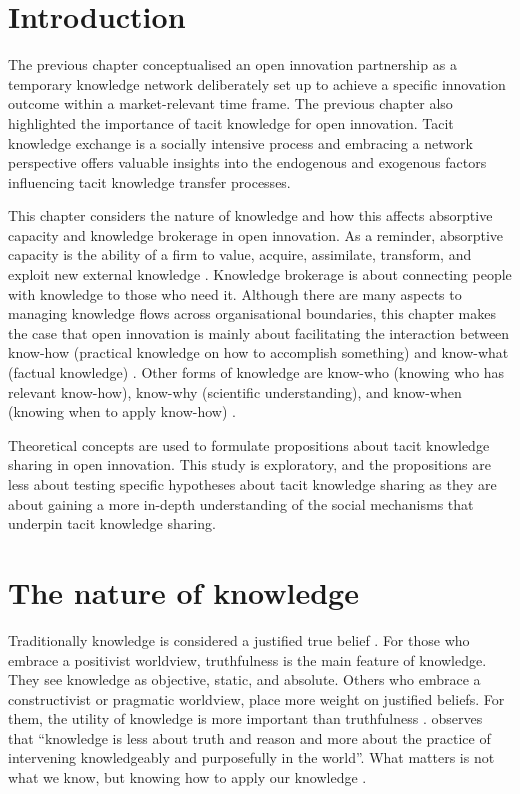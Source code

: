 
\section{Introduction}

The previous chapter conceptualised an open innovation partnership as a temporary knowledge network deliberately set up to achieve a specific innovation outcome within a market-relevant time frame. The previous chapter also highlighted the importance of tacit knowledge for open innovation. Tacit knowledge exchange is a socially intensive process and embracing a network perspective offers valuable insights into the endogenous and exogenous factors influencing tacit knowledge transfer processes. \medskip

This chapter considers the nature of knowledge and how this affects absorptive capacity and knowledge brokerage in open innovation. As a reminder, absorptive capacity is the ability of a firm to value, acquire, assimilate, transform, and exploit new external knowledge \citep{cohen1990absorptive}. Knowledge brokerage is about connecting people with knowledge to those who need it. Although there are many aspects to managing knowledge flows across organisational boundaries, this chapter makes the case that open innovation is mainly about facilitating the interaction between know-how (practical knowledge on how to accomplish something) and know-what (factual knowledge) \citep{winter1987knowledge,garud1997distinction}. Other forms of knowledge are know-who (knowing who has relevant know-how), know-why (scientific understanding), and know-when (knowing when to apply know-how) \citep{hulme2014editorial}. \medskip

Theoretical concepts are used to formulate propositions about tacit knowledge sharing in open innovation. This study is exploratory, and the propositions are less about testing specific hypotheses about tacit knowledge sharing as they are about gaining a more in-depth understanding of the social mechanisms that underpin tacit knowledge sharing. 

\section{The nature of knowledge}

Traditionally knowledge is considered a justified true belief \citep{bolisani2018elusive}. For those who embrace a positivist worldview, truthfulness is the main feature of knowledge. They see knowledge as objective, static, and absolute. Others who embrace a constructivist or pragmatic worldview, place more weight on justified beliefs. For them, the utility of knowledge is more important than truthfulness \citep{bolisani2018elusive}. \citet{spender1996organizational} observes that \enquote{knowledge is less about truth and reason and more about the practice of intervening knowledgeably and purposefully in the world}. What matters is not what we know, but knowing how to apply our knowledge \citep{ryle1949concept,orlikowski2002knowing}. \medskip


